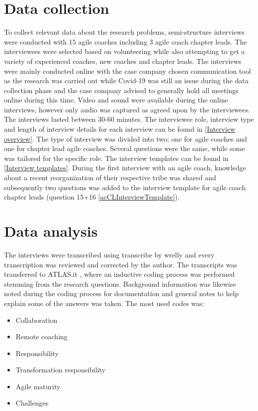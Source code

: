 \documentclass[11pt,a4paper]{report}
\begin{document}
\section{Data collection}
To collect relevant data about the research problems, semi-structure interviews were conducted with 15 agile coaches including 3 agile coach chapter leads. The interviewees were selected based on volunteering while also attempting to get a variety of experienced coaches, new coaches and chapter leads. The interviews were mainly conducted online with the case company chosen communication tool as the research was carried out while Covid-19 was still an issue during the data collection phase and the case company advised to generally hold all meetings online during this time. Video and sound were available during the online interviews, however only audio was captured as agreed upon by the interviewees. The interviews lasted between 30-60 minutes. The interviewee role, interview type and length of interview details for each interview can be found in \autoref{Interview overview}. 
The type of interview was divided into two; one for agile coaches and one for chapter lead agile coaches. Several questions were the same, while some was tailored for the specific role. The interview templates can be found in \autoref{Interview templates}. During the first interview with an agile coach, knowledge about a recent reorganization of their respective tribe was shared and subsequently two questions was added to the interview template for agile coach chapter leads (question 15+16 \autoref{acCLInterviewTemplate}).
\section{Data analysis}
The interviews were transcribed using transcribe by wrelly \cite{wreallyTranscribe} and every transcription was reviewed and corrected by the author. The transcripts was transferred to ATLAS.it \cite{atlastCodingSoftware}, where an inductive coding process was performed stemming from the research questions. Background information was likewise noted during the coding process for documentation and general notes to help explain some of the answers was taken. The most used codes was: 
\begin{itemize}
    \item Collaboration
    \item Remote coaching
    \item Responsibility 
    \item Transformation responsibility
    \item Agile maturity
    \item Challenges
\end{itemize}
\end{document}
